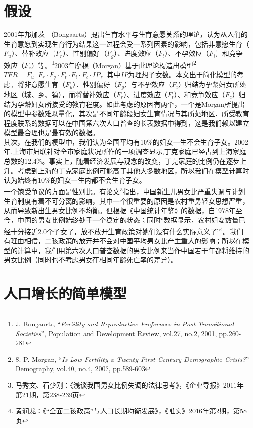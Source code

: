 \documentclass[a4paper]{article}
\begin{document}
\part{假设}
2001年邦加茨 （Bongaarts）提出生育水平与生育意愿关系的理论，认为从人们的生育意愿到实现生育行为结果这一过程会受一系列因素的影响，包括非意愿生育（$F_u$）、替补效应（$F_r$）、性别偏好（$F_g$）、进度效应（$F_t$）、不孕效应（$F_i$）和竞争效应（$F_c$）等。\footnote{J. Bongaarts, “\textit{Fertility and Reproductive Prefernces in Post-Transitional Societies}”, Population and Development Review, vol.27, no.2, 2001, pp.260-281}2003年摩根（Morgan）基于此理论构造出模型\footnote{S. P. Morgan, “\textit{Is Low Fertility a Twenty-First-Century Demographic Crisis?}” Demography, vol.40, no.4, 2003, pp.589-603}$TFR=F_u \cdot F_r \cdot F_g \cdot F_t \cdot F_i \cdot F_c \cdot IP$，其中$IP$为理想子女数。本文出于简化模型的考虑，将非意愿生育（$F_u$）、性别偏好（$F_g$）与不孕效应（$F_i$）归结为孕龄妇女所处地区（城、乡、镇），而将替补效应（$F_r$）、进度效应（$F_t$）、和竞争效应（$F_c$）归结为孕龄妇女所接受的教育程度。如此考虑的原因有两个，一个是Morgan所提出的模型中参数难以量化，其次是不同年龄段妇女生育情况与其所处地区、所受教育程度联系的数据可以在中国第六次人口普查的长表数据中得到，这是我们赖以建立模型最合理也是最有效的数据。\\
\indent
其次，在我们的模型中，我们认为全国平均有10\%的妇女一生不会生育子女。2002年,上海市妇联针对全市家庭状况所作的一项调查显示,丁克家庭已经占到上海家庭总数的12.4\%。事实上，随着经济发展与观念的改变，丁克家庭的比例仍在逐步上升。考虑到上海的丁克家庭比例可能高于其他大多数地区，所以我们在模型计算时认为始终有10\%的妇女一生内都不会生育子女。\\
\indent
一个饱受争议的方面是性别比。有论文\footnote{马秀文、石少刚：《浅谈我国男女比例失调的法律思考》，《企业导报》2011年第21期，第238-239页}指出，中国新生儿男女比严重失调与计划生育制度有着不可分离的影响，其中一个很重要的原因是农村重男轻女思想严重，从而导致新出生男女比例不均衡。但根据《中国统计年鉴》的数据，自1978年至今，中国的男女比例始终处于一个稳定的状态；同时“数据显示，农村妇女数量已经十分接近2.0个子女了，放不放开生育政策对她们没有什么实际意义了”\footnote{黄润龙：《“全面二孩政策”与人口长期均衡发展》，《唯实》2016年第2期，第58页}。我们有理由相信，二孩政策的放开并不会对中国平均男女比产生重大的影响；所以在模型的计算中，我们用第六次人口普查数据的男女比例来当作中国若干年都将维持的男女比例（同时也不考虑男女在相同年龄死亡率的差异）。
\part{人口增长的简单模型}
\label{simple_model}
\end{document}
